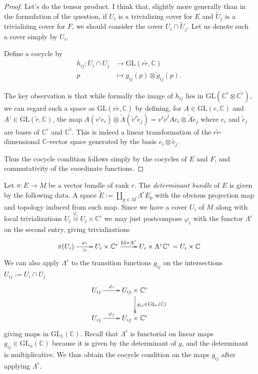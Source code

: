 \begin{proof}
Let's do the tensor product.
I think that, slightly more generally than in
the
formulation of the question, if $U_i$
is a trivializing cover for $E$ and
$\tilde{U}_j$ is a trivializing cover for
$F$,
we should consider the cover $U_i\cap
\tilde{U}_j$.
Let us denote such a cover simply by $U_i$.

Define a cocycle by
$$
\begin{aligned}
h_{ij}: U_i\cap U_j &\longrightarrow
\text{GL}(r\tilde{r},\mathbb{C}) \\
p &\longmapsto g_{ij}(p)\otimes
\tilde{g}_{ij}(p).
\end{aligned}
$$

\noindent
The key observation is that while formally
the image of $h_{ij}$
lies in $\text{GL}(\mathbb{C}^r \otimes
\mathbb{C}^{\tilde{r}})$,
we can regard such a space as
$\text{GL}(r\tilde{r},\mathbb{C})$
by defining, for $A \in
\text{GL}(r,\mathbb{C})$
and $A' \in \text{GL}(\tilde{r},\mathbb{C})$,
the map $A(v^ie_i) \otimes
\tilde{A}(\tilde{v}^j\tilde{e}_j)
=v^i\tilde{v}^j Ae_i \otimes
\tilde{A}\tilde{e}_j$
where $e_i$ and $\tilde{e}_j$ are bases
of $\mathbb{C}^r$ and
$\mathbb{C}^{\tilde{r}}$.
This is indeed a linear transformation of the
$r\tilde{r}$-dimensional $\mathbb{C}$-vector
space
generated by the basis $e_i \otimes
\tilde{e}_j$.

Thus the cocycle condition follows simply by
the cocycles of $E$ and $F$, and
commutativity of the
coordinate functions.
\end{proof}

\begin{example}
\label{example-determinant-bundle}
Let $\pi:E \to M$ be a vector bundle of rank
$r$.
The {\it determinant bundle} of $E$ is given
by the following data.
A space $\tilde{E}:=\coprod_{p \in
M}\Lambda^rE_p$
with the obvious projection map
and topology induced from such map.
Since we have a cover $U_i$ of $M$
along with local trivializations
$U_i\overset{\varphi_i}{\simeq}
U_i\times\mathbb{C}^r$
we may just postcompose $\varphi_i$ with the
functor $\Lambda^r$
on the second entry, giving trivializations
$$
\xymatrix{
\pi(U_i)\ar[r]^-{\varphi_i}_-{\simeq}
& U_i \times
\mathbb{C}^r\ar[r]^-{\text{Id}\times
\Lambda^r}
& U_i \times \Lambda^r\mathbb{C}^r=U_i \times
\mathbb{C}
}
$$
We can also apply $\Lambda^r$ to the
transition functions
$g_{ij}$ on the intersections
$U_{ij}:=U_i\cap U_j$
$$
\xymatrix{
U_{ij}\ar[r]^-{\varphi_i}&U_{ij} \times
\mathbb{C}^r
\ar[d]^{g_{ij}\in\text{GL}_r(\mathbb{C})}\\
U_{ij}\ar[r]^-{\varphi_j}&U_{ij}
\times\mathbb{C}^r
}
$$
giving maps in $\text{GL}_1(\mathbb{C})$.
Recall that $\Lambda^r$ is functorial on
linear maps
$g_{ij}\in \text{GL}_n(\mathbb{C})$ because
it is given by the determinant of $g$,
and the determinant is multiplicative.
We thus obtain the cocycle condition on the
maps $g_{ij}$
after applying $\Lambda^r$.
\end{example}

